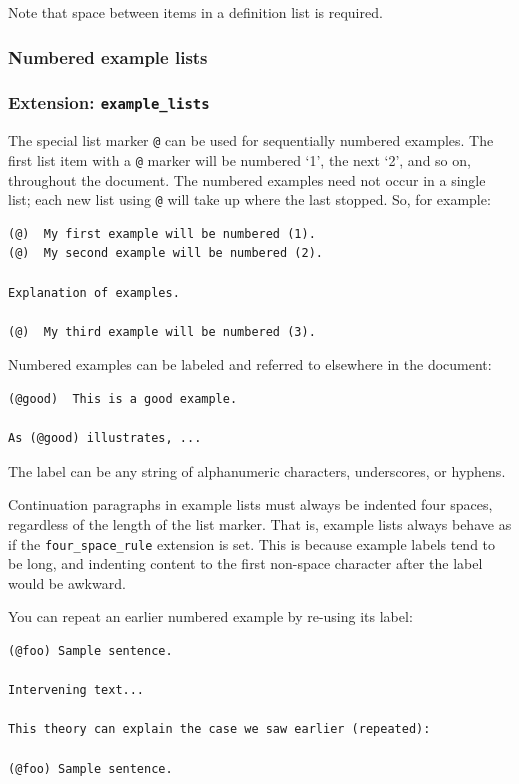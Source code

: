 \documentclass[
]{article}
\begin{document}
Note that space between items in a definition list is required.

\hypertarget{numbered-example-lists}{%
\subsubsection{Numbered example lists}\label{numbered-example-lists}}

\hypertarget{extension-example_lists}{%
\subsubsection{\texorpdfstring{Extension:
\texttt{example\_lists}}{Extension: example\_lists}}\label{extension-example_lists}}

The special list marker \texttt{@} can be used for sequentially numbered
examples. The first list item with a \texttt{@} marker will be numbered
`1', the next `2', and so on, throughout the document. The numbered
examples need not occur in a single list; each new list using \texttt{@}
will take up where the last stopped. So, for example:

\begin{verbatim}
(@)  My first example will be numbered (1).
(@)  My second example will be numbered (2).

Explanation of examples.

(@)  My third example will be numbered (3).
\end{verbatim}

Numbered examples can be labeled and referred to elsewhere in the
document:

\begin{verbatim}
(@good)  This is a good example.

As (@good) illustrates, ...
\end{verbatim}

The label can be any string of alphanumeric characters, underscores, or
hyphens.

Continuation paragraphs in example lists must always be indented four
spaces, regardless of the length of the list marker. That is, example
lists always behave as if the \texttt{four\_space\_rule} extension is
set. This is because example labels tend to be long, and indenting
content to the first non-space character after the label would be
awkward.

You can repeat an earlier numbered example by re-using its label:

\begin{verbatim}
(@foo) Sample sentence.

Intervening text...

This theory can explain the case we saw earlier (repeated):

(@foo) Sample sentence.
\end{verbatim}
\end{document}
